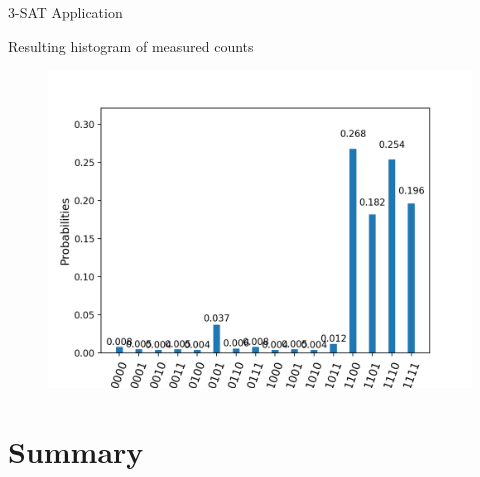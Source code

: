\documentclass{beamer}
\begin{document}
\begin{frame}{3-SAT Application}
	\begin{center}
		Resulting histogram of measured counts
	\end{center}
	\begin{figure}[Resulting histogram of measured counts]
		\centering
		\includegraphics[scale=.55]{./3_sat.png}
	\end{figure}
\end{frame}
\section*{Summary}
\end{document}
